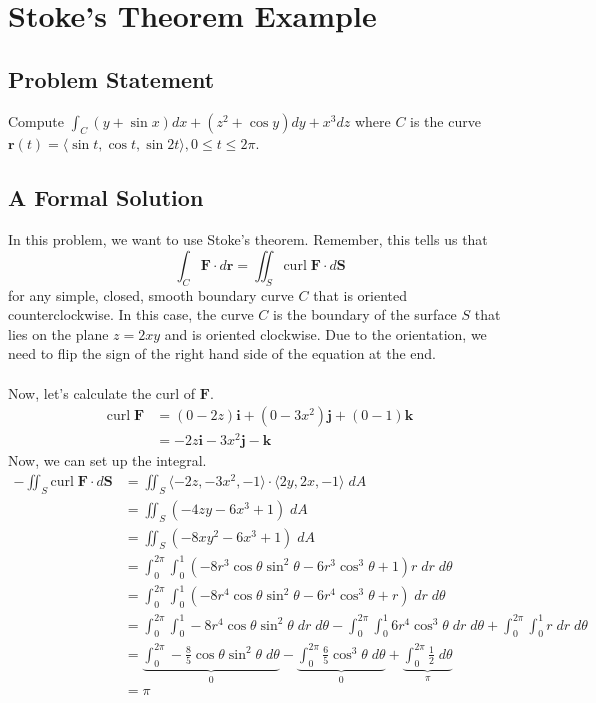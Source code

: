 \section{Stoke's Theorem Example}
\subsection{Problem Statement}
    Compute $\int_C(y+\sin x) d x+\left(z^2+\cos y\right) d y+x^3 d z$ where $C$ is the curve $\mathbf{r}(t)=\langle\sin t, \cos t, \sin 2 t\rangle, 0 \leqslant t \leqslant 2 \pi$.
\subsection{A Formal Solution}
In this problem, we want to use Stoke's theorem. Remember, this tells us that
$$
\int_C \mathbf{F} \cdot d\mathbf{r} = \iint_S \text{curl}\;\mathbf{F} \cdot d\mathbf{S}
$$
for any simple, closed, smooth boundary curve $C$ that is oriented counterclockwise. In this case, the curve $C$ is the boundary of the surface $S$ that lies on the plane $z = 2xy$ and is oriented clockwise. Due to the orientation, we need to flip the sign of the right hand side of the equation at the end.\\
\\
Now, let's calculate the curl of $\mathbf{F}$.
\begin{align*}
\text{curl} \;\mathbf{F} &= \left(0 - 2z\right)\mathbf{i} + \left(0 - 3x^2\right)\mathbf{j} + \left(0 - 1\right)\mathbf{k}\\
&= -2z\mathbf{i} - 3x^2\mathbf{j} - \mathbf{k}
\end{align*}
Now, we can set up the integral.
\begin{align*}
    -\iint_S \text{curl}\;\mathbf{F} \cdot d\mathbf{S} &= \iint_S \langle -2z, -3x^2, -1 \rangle \cdot \langle 2y, 2x, -1 \rangle \;dA \\
    &= \iint_S \left(-4zy - 6x^3 + 1\right) \;dA\\
    &= \iint_S \left(-8xy^2 - 6x^3 + 1\right) \;dA\\
    &= \int_0^{2\pi} \int_0^1 \left(-8r^3 \cos \theta \sin^2 \theta - 6 r^3 \cos^3 \theta + 1\right)r\;dr\;d\theta\\
    &= \int_0^{2\pi} \int_0^1 \left(-8r^4 \cos \theta \sin^2 \theta - 6 r^4 \cos^3 \theta + r\right)\;dr\;d\theta\\
    &= \int_0^{2\pi} \int_0^1  -8r^4 \cos\theta \sin^2\theta \;dr\;d\theta - \int_0^{2\pi} \int_0^1 6r^4 \cos^3\theta \;dr\;d\theta + \int_0^{2\pi} \int_0^1 r\;dr\;d\theta\\
    &= \underbrace{\int_0^{2\pi} -\frac{8}{5} \cos \theta \sin^2 \theta \;d\theta}_{0} - \underbrace{\int_0^{2\pi} \frac{6}{5} \cos^3 \theta \;d\theta}_{0} + \underbrace{\int_0^{2\pi} \frac{1}{2} \;d\theta}_{\pi}\\
    &= \boxed{\pi}
\end{align*}
